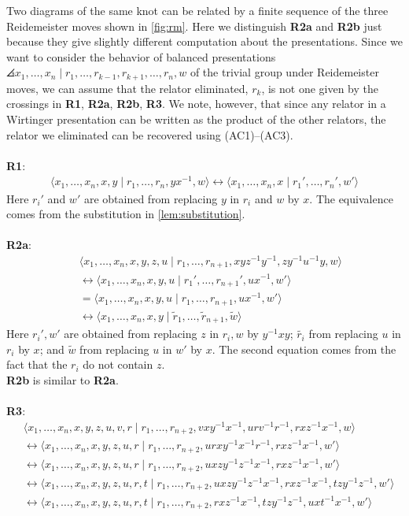 Two diagrams of the same knot can be related by a finite sequence of the three
Reidemeister moves shown in \autoref{fig:rm}. Here we distinguish \textbf{R2a} and \textbf{R2b} just because they give slightly different computation about the presentations. Since we want to consider the behavior of balanced presentations $\angles{ x_1,\ldots, x_n \mid  r_1,\ldots, r_{k-1}, r_{k+1},\ldots, r_n, w}$ of the trivial group under Reidemeister moves, we can assume that the relator eliminated, $r_k$, is not one given by the crossings in \textbf{R1}, \textbf{R2a}, \textbf{R2b}, \textbf{R3}. We note, however, that since any relator in a Wirtinger presentation can be written as the product of the other relators, the relator we eliminated can be recovered using (AC1)--(AC3).
\\
\\
\textbf{R1}:
\begin{align*}
\langle x_1,\ldots,x_n,x,y\mid r_1,\ldots,r_n,yx^{-1},w\rangle\longleftrightarrow\langle x_1,\ldots,x_n,x\mid r_1',\ldots,r_n',w'\rangle
\end{align*}
Here $r_i'$ and $w'$ are obtained from replacing $y$ in $r_i$ and $w$ by $x$. The equivalence comes from the substitution in \autoref{lem:substitution}.
\\
\\
\textbf{R2a}:
\begin{align*}
\,\,&\langle x_1,\ldots,x_n,x,y,z,u\mid r_1,\ldots,r_{n+1},xyz^{-1}y^{-1},zy^{-1}u^{-1}y,w\rangle
\\
&\longleftrightarrow\langle x_1,\ldots,x_n,x,y,u\mid r_1',\ldots,r_{n+1}',ux^{-1},w'\rangle
\\
&=\langle x_1,\ldots,x_n,x,y,u\mid r_1,\ldots,r_{n+1},ux^{-1},w'\rangle
\\
&\longleftrightarrow\langle x_1,\ldots,x_n,x,y\mid \tilde{r}_1,\ldots,\tilde{r}_{n+1},\tilde{w}\rangle
\end{align*}
Here $r_i',w'$ are obtained from replacing $z$ in $r_i,w$ by $y^{-1}xy$; $\tilde{r_i}$ from replacing $u$ in $r_i$ by $x$; and $\tilde{w}$ from replacing $u$ in $w'$ by $x$. The second equation comes from the fact that the $r_i$ do not contain $z$.
\\
\textbf{R2b} is similar to \textbf{R2a}.
\\
\\
\textbf{R3}:
\begin{align*}
&\langle x_1,\ldots,x_n,x,y,z,u,v,r\mid r_1,\ldots,r_{n+2},vxy^{-1}x^{-1},urv^{-1}r^{-1},rxz^{-1}x^{-1},w\rangle
\\
&\longleftrightarrow\langle x_1,\ldots,x_n,x,y,z,u,r\mid r_1,\ldots,r_{n+2},urxy^{-1}x^{-1}r^{-1},rxz^{-1}x^{-1},w'\rangle
\\
&\longleftrightarrow\langle x_1,\ldots,x_n,x,y,z,u,r\mid r_1,\ldots,r_{n+2},uxzy^{-1}z^{-1}x^{-1},rxz^{-1}x^{-1},w'\rangle
\\
&\longleftrightarrow\langle x_1,\ldots,x_n,x,y,z,u,r,t\mid r_1,\ldots,r_{n+2},uxzy^{-1}z^{-1}x^{-1},rxz^{-1}x^{-1},tzy^{-1}z^{-1},w'\rangle
\\
&\longleftrightarrow\langle x_1,\ldots,x_n,x,y,z,u,r,t\mid r_1,\ldots,r_{n+2},rxz^{-1}x^{-1},tzy^{-1}z^{-1},uxt^{-1}x^{-1},w'\rangle
\end{align*}
